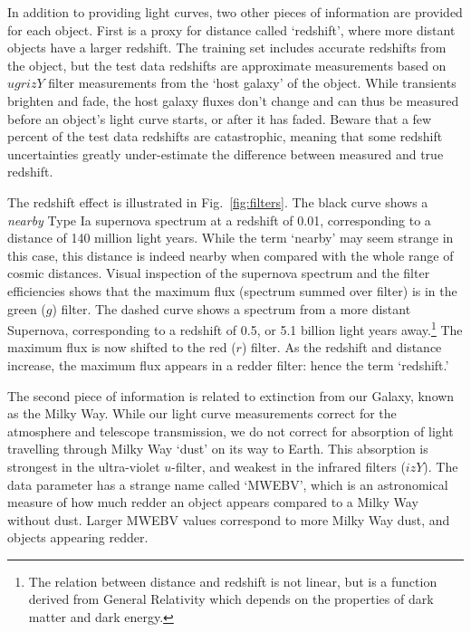 In addition to providing light curves, two other pieces of information are provided
for each object.
First is a proxy for distance called `redshift', where more distant objects have a larger redshift.
The training set includes accurate redshifts from the object, but the test data redshifts
are approximate measurements based on $ugrizY$ filter measurements from the `host galaxy' 
of the object. While transients brighten and fade, the host galaxy fluxes don't change
and can thus be measured before an object's light curve starts, or after it has faded.
Beware that a few percent of the test data redshifts are catastrophic, 
meaning that some redshift uncertainties greatly under-estimate the difference
between measured and true redshift.


The redshift effect is illustrated in Fig.~\ref{fig:filters}.
The black curve shows a {\it nearby} Type Ia supernova spectrum at a redshift of 0.01,
corresponding to a distance of 140 million light years. 
While the term `nearby' may seem strange in this case, this distance is 
indeed nearby when compared with the whole range of cosmic distances.
Visual inspection of the supernova spectrum and the filter efficiencies shows that
the maximum flux (spectrum summed over filter) is in the 
green ($g$) filter.
The dashed curve shows a spectrum from a more distant Supernova, 
corresponding to a redshift of 0.5, or 5.1 billion light years 
away.\footnote{The relation between distance and redshift is not linear, 
but is a function derived from General Relativity which depends on the properties of 
dark matter and dark energy.}  %
The maximum flux is now shifted to the red ($r$) filter.
As the redshift and distance increase, the maximum flux appears
in a redder filter: hence the term `redshift.'

The second piece of information is related to extinction from our Galaxy, 
known as the Milky Way. While our light curve measurements correct
for the atmosphere and telescope transmission, we do not correct for
absorption of light travelling through Milky Way `dust' on its way to Earth.
This absorption is strongest in the ultra-violet $u$-filter, and weakest
in the infrared filters ($izY$). 
The data parameter has a strange name called `MWEBV', which is an 
astronomical measure of how much redder an object appears compared
to a Milky Way without dust. 
Larger MWEBV values correspond to more Milky Way dust,
and objects appearing redder.


